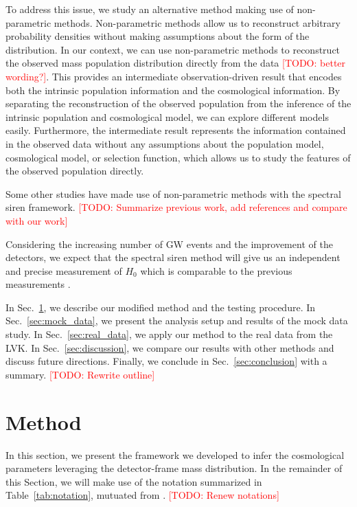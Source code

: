 \documentclass[aps,prd,twocolumn,superscriptaddress,preprintnumbers,nofootinbib,hidelinks]{revtex4-2}
\newcommand{\todo}[1]{\textcolor{red}{[TODO: #1]}}
\begin{document}
To address this issue, we study an alternative method making use of non-parametric methods.
Non-parametric methods allow us to reconstruct arbitrary probability densities without making assumptions about the form of the distribution.
In our context, we can use non-parametric methods to reconstruct the observed mass population distribution directly from the data \todo{better wording?}.
This provides an intermediate observation-driven result that encodes both the intrinsic population information and the cosmological information.
By separating the reconstruction of the observed population from the inference of the intrinsic population and cosmological model, we can explore different models easily.
Furthermore, the intermediate result represents the information contained in the observed data without any assumptions about the population model, cosmological model, or selection function, which allows us to study the features of the observed population directly.

Some other studies have made use of non-parametric methods with the spectral siren framework.
\todo{Summarize previous work, add references and compare with our work}

Considering the increasing number of \ac{GW} events and the improvement of the detectors, we expect that the spectral siren method will give us an independent and precise measurement of $H_0$ which is comparable to the previous measurements \citep{Planck:2018vyg, Riess:2021jrx}.

In Sec.~\ref{sec:method}, we describe our modified method and the testing procedure.
In Sec.~\ref{sec:mock_data}, we present the analysis setup and results of the mock data study.
In Sec.~\ref{sec:real_data}, we apply our method to the real data from the \ac{LVK}.
In Sec.~\ref{sec:discussion}, we compare our results with other methods and discuss future directions.
Finally, we conclude in Sec.~\ref{sec:conclusion} with a summary.
\todo{Rewrite outline}

\section{Method}
\label{sec:method}
In this section, we present the framework we developed to infer the cosmological parameters leveraging the detector-frame mass distribution. In the remainder of this Section, we will make use of the notation summarized in Table~\ref{tab:notation}, mutuated from \citet{Rinaldi:2021bhm, Rinaldi:2022kyg}.
\todo{Renew notations}
\end{document}
